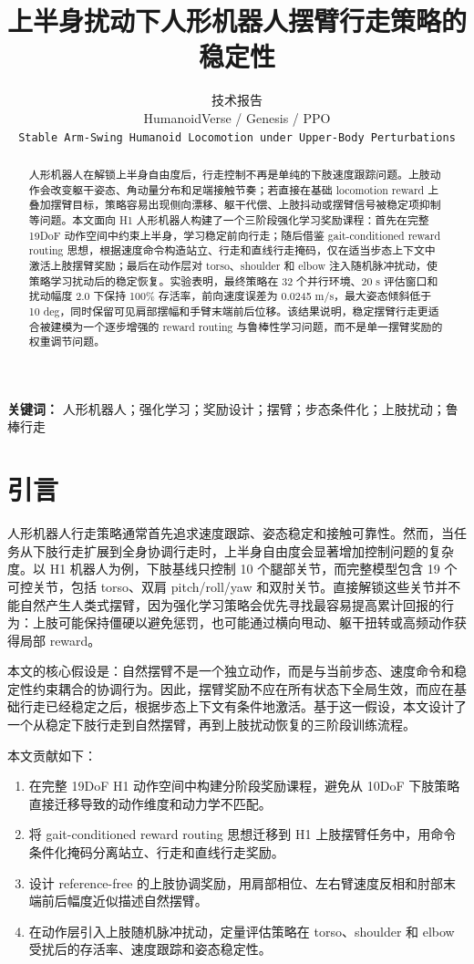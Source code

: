 \documentclass{article}
\title{上半身扰动下人形机器人摆臂行走策略的稳定性}
\author{%
  技术报告 \\
  HumanoidVerse / Genesis / PPO \\
  \texttt{Stable Arm-Swing Humanoid Locomotion under Upper-Body Perturbations}
}
\begin{document}
\maketitle

\begin{abstract}
人形机器人在解锁上半身自由度后，行走控制不再是单纯的下肢速度跟踪问题。上肢动作会改变躯干姿态、角动量分布和足端接触节奏；若直接在基础 locomotion reward 上叠加摆臂目标，策略容易出现侧向漂移、躯干代偿、上肢抖动或摆臂信号被稳定项抑制等问题。本文面向 H1 人形机器人构建了一个三阶段强化学习奖励课程：首先在完整 19DoF 动作空间中约束上半身，学习稳定前向行走；随后借鉴 gait-conditioned reward routing 思想，根据速度命令构造站立、行走和直线行走掩码，仅在适当步态上下文中激活上肢摆臂奖励；最后在动作层对 torso、shoulder 和 elbow 注入随机脉冲扰动，使策略学习扰动后的稳定恢复。实验表明，最终策略在 32 个并行环境、20 s 评估窗口和扰动幅度 2.0 下保持 100\% 存活率，前向速度误差为 0.0245 m/s，最大姿态倾斜低于 10 deg，同时保留可见肩部摆幅和手臂末端前后位移。该结果说明，稳定摆臂行走更适合被建模为一个逐步增强的 reward routing 与鲁棒性学习问题，而不是单一摆臂奖励的权重调节问题。
\end{abstract}

\textbf{关键词：} 人形机器人；强化学习；奖励设计；摆臂；步态条件化；上肢扰动；鲁棒行走

\section{引言}

人形机器人行走策略通常首先追求速度跟踪、姿态稳定和接触可靠性。然而，当任务从下肢行走扩展到全身协调行走时，上半身自由度会显著增加控制问题的复杂度。以 H1 机器人为例，下肢基线只控制 10 个腿部关节，而完整模型包含 19 个可控关节，包括 torso、双肩 pitch/roll/yaw 和双肘关节。直接解锁这些关节并不能自然产生人类式摆臂，因为强化学习策略会优先寻找最容易提高累计回报的行为：上肢可能保持僵硬以避免惩罚，也可能通过横向甩动、躯干扭转或高频动作获得局部 reward。

本文的核心假设是：自然摆臂不是一个独立动作，而是与当前步态、速度命令和稳定性约束耦合的协调行为。因此，摆臂奖励不应在所有状态下全局生效，而应在基础行走已经稳定之后，根据步态上下文有条件地激活。基于这一假设，本文设计了一个从稳定下肢行走到自然摆臂，再到上肢扰动恢复的三阶段训练流程。

本文贡献如下：
\begin{enumerate}
  \item 在完整 19DoF H1 动作空间中构建分阶段奖励课程，避免从 10DoF 下肢策略直接迁移导致的动作维度和动力学不匹配。
  \item 将 gait-conditioned reward routing 思想迁移到 H1 上肢摆臂任务中，用命令条件化掩码分离站立、行走和直线行走奖励。
  \item 设计 reference-free 的上肢协调奖励，用肩部相位、左右臂速度反相和肘部末端前后幅度近似描述自然摆臂。
  \item 在动作层引入上肢随机脉冲扰动，定量评估策略在 torso、shoulder 和 elbow 受扰后的存活率、速度跟踪和姿态稳定性。
\end{enumerate}
\end{document}
